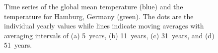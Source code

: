 \documentclass[a4paper]{scrartcl}
\begin{document}
\begin{figure}[h!]
 \centering
 \qquad
 
 \qquad
 
 \caption{Time series of the global mean temperature (blue) and the temperature for Hamburg, Germany (green). The dots are the individual yearly values while lines indicate moving averages with averaging intervals of (a) 5~years, (b) 11~years, (c) 31~years, and (d) 51~years.}
\end{figure}
\end{document}
